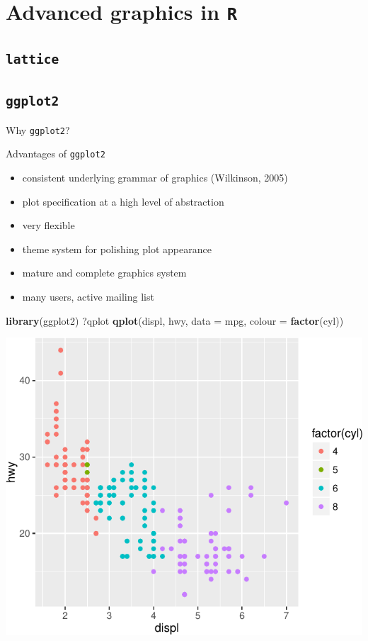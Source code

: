 \documentclass[]{article}
\def\tightlist{}
\newenvironment{Shaded}{\begin{snugshade}}{\end{snugshade}}
\newcommand{\KeywordTok}[1]{\textcolor[rgb]{0.13,0.29,0.53}{\textbf{{#1}}}}
\newcommand{\DataTypeTok}[1]{\textcolor[rgb]{0.13,0.29,0.53}{{#1}}}
\newcommand{\NormalTok}[1]{{#1}}
\numberwithin{equation}{section}
\begin{document}
\section{\texorpdfstring{Advanced graphics in
\texttt{R}}{Advanced graphics in R}}\label{advanced-graphics-in-r}

\subsection{\texorpdfstring{\texttt{lattice}}{lattice}}\label{lattice}

\subsection{\texorpdfstring{\texttt{ggplot2}}{ggplot2}}\label{ggplot2}

Why \texttt{ggplot2}?

Advantages of \texttt{ggplot2}

\begin{itemize}
\tightlist
\item
  consistent underlying grammar of graphics (Wilkinson, 2005)
\item
  plot specification at a high level of abstraction
\item
  very flexible
\item
  theme system for polishing plot appearance
\item
  mature and complete graphics system
\item
  many users, active mailing list
\end{itemize}

\begin{Shaded}
\begin{Highlighting}[]
\KeywordTok{library}\NormalTok{(ggplot2)}
\NormalTok{?qplot}
\KeywordTok{qplot}\NormalTok{(displ, hwy, }\DataTypeTok{data =} \NormalTok{mpg, }\DataTypeTok{colour =} \KeywordTok{factor}\NormalTok{(cyl))}
\end{Highlighting}
\end{Shaded}

\includegraphics{index_files/figure-latex/unnamed-chunk-235-1.pdf}
\end{document}
